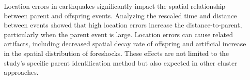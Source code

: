 \documentclass[12pt]{article} %
\theoremstyle{plain}
\begin{document}
	
	Location errors in earthquakes significantly impact the spatial relationship between parent and offspring events. Analyzing the rescaled time and distance between events showed that high location errors increase the distance-to-parent, particularly when the parent event is large. Location errors can cause related artifacts, including decreased spatial decay rate of offspring and artificial increase in the spatial distribution of foreshocks. These effects are not limited to the study's specific parent identification method but also expected in other cluster approaches.
	
\end{document}
